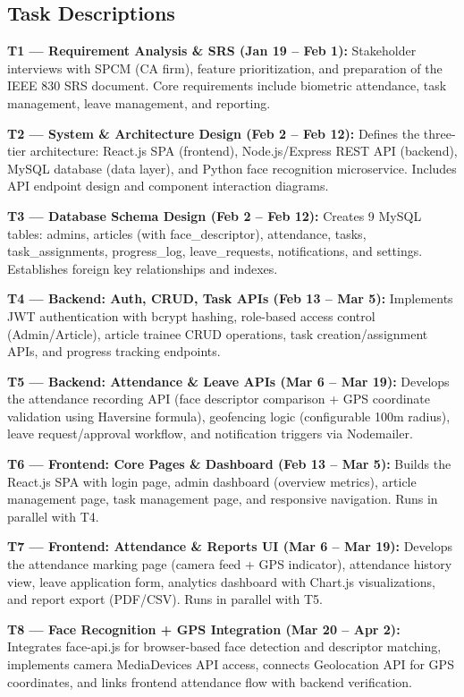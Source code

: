 \documentclass[12pt,a4paper]{article}
\begin{document}
\subsection{Task Descriptions}

\textbf{T1 --- Requirement Analysis \& SRS (Jan 19 -- Feb 1):}
Stakeholder interviews with SPCM (CA firm), feature prioritization, and preparation of the IEEE 830 SRS document. Core requirements include biometric attendance, task management, leave management, and reporting.

\textbf{T2 --- System \& Architecture Design (Feb 2 -- Feb 12):}
Defines the three-tier architecture: React.js SPA (frontend), Node.js/Express REST API (backend), MySQL database (data layer), and Python face recognition microservice. Includes API endpoint design and component interaction diagrams.

\textbf{T3 --- Database Schema Design (Feb 2 -- Feb 12):}
Creates 9 MySQL tables: admins, articles (with face\_descriptor), attendance, tasks, task\_assignments, progress\_log, leave\_requests, notifications, and settings. Establishes foreign key relationships and indexes.

\textbf{T4 --- Backend: Auth, CRUD, Task APIs (Feb 13 -- Mar 5):}
Implements JWT authentication with bcrypt hashing, role-based access control (Admin/Article), article trainee CRUD operations, task creation/assignment APIs, and progress tracking endpoints.

\textbf{T5 --- Backend: Attendance \& Leave APIs (Mar 6 -- Mar 19):}
Develops the attendance recording API (face descriptor comparison + GPS coordinate validation using Haversine formula), geofencing logic (configurable 100m radius), leave request/approval workflow, and notification triggers via Nodemailer.

\textbf{T6 --- Frontend: Core Pages \& Dashboard (Feb 13 -- Mar 5):}
Builds the React.js SPA with login page, admin dashboard (overview metrics), article management page, task management page, and responsive navigation. Runs in parallel with T4.

\textbf{T7 --- Frontend: Attendance \& Reports UI (Mar 6 -- Mar 19):}
Develops the attendance marking page (camera feed + GPS indicator), attendance history view, leave application form, analytics dashboard with Chart.js visualizations, and report export (PDF/CSV). Runs in parallel with T5.

\textbf{T8 --- Face Recognition + GPS Integration (Mar 20 -- Apr 2):}
Integrates face-api.js for browser-based face detection and descriptor matching, implements camera MediaDevices API access, connects Geolocation API for GPS coordinates, and links frontend attendance flow with backend verification.
\end{document}
